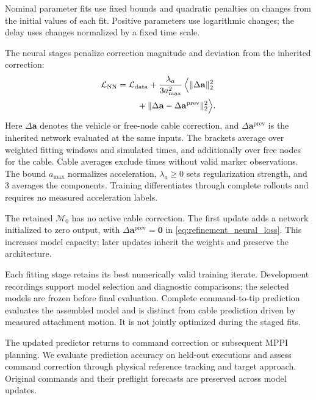 \documentclass[letterpaper, 10 pt, conference]{ieeeconf}
\begin{document}
Nominal parameter fits use fixed bounds and quadratic penalties
on changes from the initial values of each fit. Positive parameters
use logarithmic changes; the delay uses changes normalized by a
fixed time scale.

The neural stages penalize correction magnitude and deviation
from the inherited correction:
\begin{equation}
\begin{aligned}
\mathcal L_{\mathrm{NN}}
={}&\mathcal L_{\mathrm{data}}+\frac{\lambda_a}{3a_{\max}^2}\,
\Bigl\langle\|\Delta\mathbf a\|_2^2\\
&\quad+\|\Delta\mathbf a-\Delta\mathbf a^{\mathrm{prev}}\|_2^2\Bigr\rangle.
\end{aligned}
\label{eq:refinement_neural_loss}
\end{equation}
Here $\Delta\mathbf a$ denotes the vehicle or free-node cable
correction, and $\Delta\mathbf a^{\mathrm{prev}}$ is the
inherited network evaluated at the same inputs.
The brackets average over weighted fitting windows and simulated
times, and additionally over free nodes for the cable. Cable
averages exclude times without valid marker observations.
The bound $a_{\max}$ normalizes acceleration, $\lambda_a\geq0$
sets regularization strength, and $3$ averages the components.
Training differentiates through complete rollouts and requires
no measured acceleration labels.

The retained $\mathcal M_0$ has no active cable correction.
The first update adds a network initialized to zero output, with
$\Delta\mathbf a^{\mathrm{prev}}=\mathbf0$ in
\eqref{eq:refinement_neural_loss}. This increases model capacity;
later updates inherit the weights and preserve the architecture.

Each fitting stage retains its best numerically valid training
iterate. Development recordings support model selection and
diagnostic comparisons; the selected models are frozen before
final evaluation. Complete command-to-tip prediction evaluates
the assembled model and is distinct from cable prediction driven
by measured attachment motion. It is not jointly optimized during
the staged fits.

The updated predictor returns to command correction or subsequent
MPPI planning. We evaluate prediction accuracy on held-out
executions and assess command correction through physical
reference tracking and target approach. Original commands and
their preflight forecasts are preserved across model updates.



\end{document}
